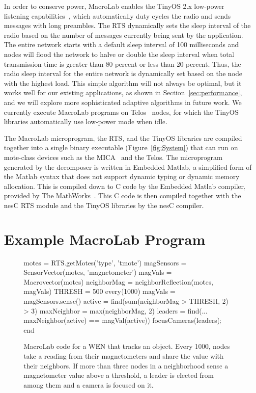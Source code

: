 In order to conserve power, MacroLab enables the TinyOS 2.x low-power
listening capabilities~\cite{Polastrea}, which automatically duty cycles the
radio and sends messages with long preambles.  The RTS dynamically
sets the sleep interval of the radio based on the number of messages
currently being sent by the application.  The entire network starts
with a default sleep interval of 100 milliseconds and nodes will
flood the network to halve or double the sleep interval when total
transmission time is greater than 80 percent or less than 20 percent.  Thus, the
radio sleep interval for the entire network is dynamically set based
on the node with the highest load.  This simple algorithm will not
always be optimal, but it works well for our existing applications,
as shown in Section~\ref{sec:performance}, and we will explore more
sophisticated adaptive algorithms in future work.  We currently
execute MacroLab programs on Telos~\cite{Polastre} nodes, for which the TinyOS libraries
automatically use low-power mode
when idle.

The MacroLab microprogram, the RTS, and the TinyOS libraries are compiled
together into a single binary executable (Figure~\ref{fig:System}) that can run
on mote-class devices such as the MICA~\cite{Crossbow} and the Telos.  The
microprogram generated by the decomposer is written in Embedded Matlab, a
simplified form of the Matlab syntax that does not support dynamic typing or
dynamic memory allocation.  This is compiled down to C code by the Embedded
Matlab compiler, provided by The MathWorks~\cite{mathworks}.  This C code is
then compiled together with the nesC RTS module and the TinyOS libraries by the
nesC compiler.

\section{Example MacroLab Program}

\begin{figure}
\begin{macrolab}
motes = RTS.getMotes('type', 'tmote')
magSensors = SensorVector(motes, 'magnetometer')
magVals = Macrovector(motes)
neighborMag = neighborReflection(motes, magVals)
THRESH = 500
every(1000)
   magVals = magSensors.sense()
   active = find(sum(neighborMag > THRESH, 2) > 3)
   maxNeighbor = max(neighborMag, 2)
   leaders = find(...
          maxNeighbor(active) == magVal(active))
   focusCameras(leaders);
end
\end{macrolab}
\caption[MacroLab code for a CPS that tracks an object]{MacroLab code for a WEN
that tracks an object. Every 1000\ms, nodes take a reading from their
magnetometers and share the value with their neighbors. If more than three nodes
in a neighborhood sense a magnetometer value above a threshold, a leader is
elected from among them and a camera is focused on it.}
\label{code:ota}
\end{figure}

